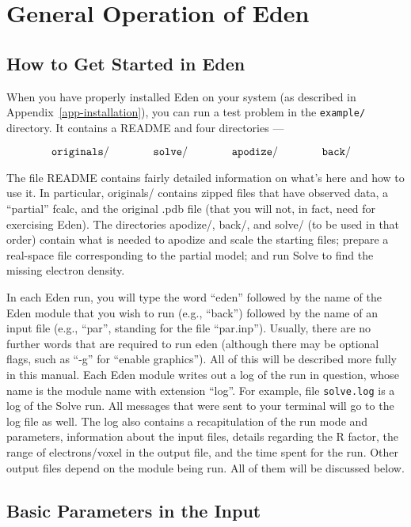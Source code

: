 \documentclass{report}
\begin{document}
\chapter{General Operation of Eden}
\label{general}

\section{How to Get Started in Eden}
\label{general-start}

When you have properly installed Eden on your system (as described in 
Appendix~\ref{app-installation}), you can run a test problem 
in the {\tt example/} directory.  It contains a README and four directories ---

\vspace {0.1in}

${\tt\qquad\qquad originals/\qquad\qquad solve/\qquad\qquad apodize/\qquad\qquad back/}$
\vspace {0.1in}

The file README contains fairly detailed information on what's here 
and how to use it.  In particular, originals/ contains zipped files that 
have observed data, a ``partial'' fcalc, and the original .pdb file (that 
you will not, in fact, need for exercising Eden).  The directories 
apodize/, back/, and solve/ (to be used in that order) contain what is
needed to apodize and scale the starting files; prepare a real-space
file corresponding to the partial model; and run Solve to find the missing 
electron density.

\vspace {0.1in}

In each Eden run, you will type the word ``eden'' followed by the name of the
Eden module that you wish to run (e.g., ``back'') followed by the name of an 
input file (e.g., ``par'', standing for the file ``par.inp'').  Usually, there 
are no further words that are required to run eden (although there may be 
optional flags, such as ``-g'' for ``enable graphics'').  All of this will be
described more fully in this manual.  Each Eden module writes out a log of
the run in question, whose name is the module name with extension ``log''.
For example, file {\tt solve.log} is a log of the Solve run. 
All messages that were sent to your terminal will go to the log file
as well.  The log also contains a recapitulation of the run mode and 
parameters, information about the input files, details regarding the R
factor, the range of electrons/voxel in the output file, and the time
spent for the run.   Other output files depend on the module being run.
All of them will be discussed below.

\section {Basic Parameters in the Input}
\label{general-basic-parameters}
\end{document}
